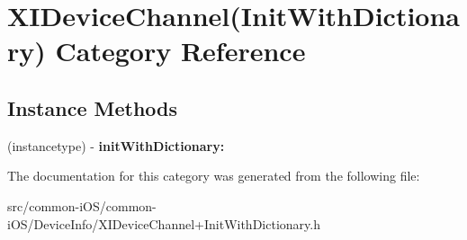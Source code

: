 \hypertarget{category_x_i_device_channel_07_init_with_dictionary_08}{}\section{X\+I\+Device\+Channel(Init\+With\+Dictionary) Category Reference}
\label{category_x_i_device_channel_07_init_with_dictionary_08}
\subsection*{Instance Methods}
\begin{DoxyCompactItemize}
\item 
\hypertarget{category_x_i_device_channel_07_init_with_dictionary_08_a40b301fddc358aaf13f51ed9266c77af}{}\label{category_x_i_device_channel_07_init_with_dictionary_08_a40b301fddc358aaf13f51ed9266c77af} 
(instancetype) -\/ {\bfseries init\+With\+Dictionary\+:}
\end{DoxyCompactItemize}


The documentation for this category was generated from the following file\+:\begin{DoxyCompactItemize}
\item 
src/common-\/i\+O\+S/common-\/i\+O\+S/\+Device\+Info/X\+I\+Device\+Channel+\+Init\+With\+Dictionary.\+h\end{DoxyCompactItemize}
